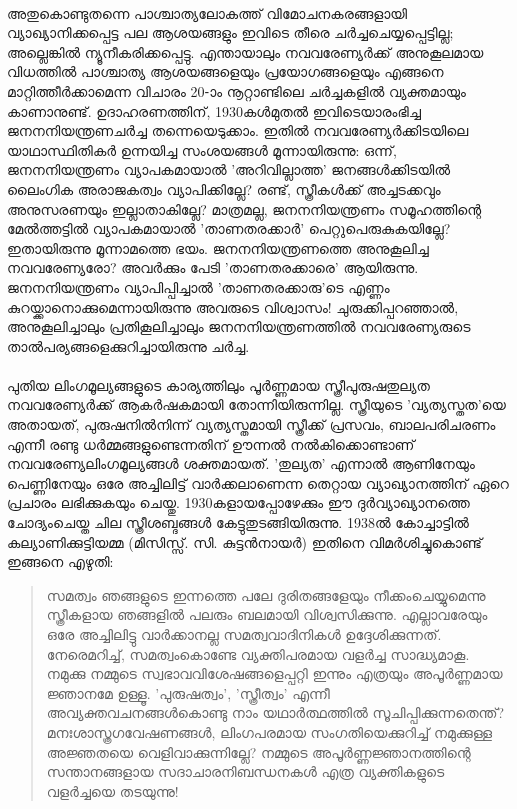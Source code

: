 \paragraph{}
അതുകൊണ്ടുതന്നെ പാശ്ചാത്യലോകത്ത് വിമോചനകരങ്ങളായി വ്യാഖ്യാനിക്കപ്പെട്ട പല ആശയങ്ങളും ഇവിടെ തീരെ ചർച്ചചെയ്യപ്പെട്ടില്ല; അല്ലെങ്കിൽ ന്യൂനീകരിക്കപ്പെട്ടു. എന്തായാലും നവവരേണ്യർക്ക് അനുകൂലമായ വിധത്തിൽ പാശ്ചാത്യ ആശയങ്ങളെയും പ്രയോഗങ്ങളെയും എങ്ങനെ മാറ്റിത്തീർക്കാമെന്ന വിചാരം 20-ാം നൂറ്റാണ്ടിലെ ചർച്ചകളിൽ വ്യക്തമായും കാണാനുണ്ട്. ഉദാഹരണത്തിന്, 1930കൾമുതൽ ഇവിടെയാരംഭിച്ച ജനനനിയന്ത്രണചർച്ച തന്നെയെടുക്കാം. ഇതിൽ നവവരേണ്യർക്കിടയിലെ യാഥാസ്ഥിതികർ ഉന്നയിച്ച സംശയങ്ങൾ മൂന്നായിരുന്നു: ഒന്ന്, ജനനനിയന്ത്രണം വ്യാപകമായാൽ 'അറിവില്ലാത്ത' ജനങ്ങൾക്കിടയിൽ ലൈംഗിക അരാജകത്വം വ്യാപിക്കില്ലേ? രണ്ട്, സ്ത്രീകൾക്ക് അച്ചടക്കവും അനുസരണയും ഇല്ലാതാകില്ലേ? മാത്രമല്ല, ജനനനിയന്ത്രണം സമൂഹത്തിന്റെ മേൽത്തട്ടിൽ വ്യാപകമായാൽ 'താണതരക്കാർ' പെറ്റുപെരുകുകയില്ലേ? ഇതായിരുന്നു മൂന്നാമത്തെ ഭയം. ജനനനിയന്ത്രണത്തെ അനുകൂലിച്ച നവവരേണ്യരോ? അവർക്കും പേടി 'താണതരക്കാരെ' ആയിരുന്നു. ജനനനിയന്ത്രണം വ്യാപിപ്പിച്ചാൽ 'താണതരക്കാരു'ടെ എണ്ണം കുറയ്ക്കാനൊക്കുമെന്നായിരുന്നു അവരുടെ വിശ്വാസം! ചുരുക്കിപ്പറഞ്ഞാൽ, അനുകൂലിച്ചാലും പ്രതികൂലിച്ചാലും ജനനനിയന്ത്രണത്തിൽ നവവരേണ്യരുടെ താൽപര്യങ്ങളെക്കുറിച്ചായിരുന്നു ചർച്ച.

\paragraph{}പുതിയ ലിംഗമൂല്യങ്ങളുടെ കാര്യത്തിലും പൂർണ്ണമായ സ്ത്രീപുരുഷതുല്യത നവവരേണ്യർക്ക് ആകർഷകമായി തോന്നിയിരുന്നില്ല. സ്ത്രീയുടെ 'വ്യത്യസ്തത'യെ അതായത്, പുരുഷനിൽനിന്ന് വ്യത്യസ്തമായി സ്ത്രീക്ക് പ്രസവം, ബാലപരിചരണം എന്നീ രണ്ടു ധർമ്മങ്ങളുണ്ടെന്നതിന് ഊന്നൽ നൽകിക്കൊണ്ടാണ് നവവരേണ്യലിംഗമൂല്യങ്ങൾ ശക്തമായത്. 'തുല്യത' എന്നാൽ ആണിനേയും പെണ്ണിനേയും ഒരേ അച്ചിലിട്ട് വാർക്കലാണെന്ന തെറ്റായ വ്യാഖ്യാനത്തിന് ഏറെ പ്രചാരം ലഭിക്കുകയും ചെയ്തു. 1930കളായപ്പോഴേക്കും ഈ ദുർവ്യാഖ്യാനത്തെ ചോദ്യംചെയ്ത ചില സ്ത്രീശബ്ദങ്ങൾ കേട്ടുതുടങ്ങിയിരുന്നു. 1938ൽ കോച്ചാട്ടിൽ കല്യാണിക്കുട്ടിയമ്മ (മിസിസ്സ്. സി. കുട്ടൻനായർ) ഇതിനെ വിമർശിച്ചുകൊണ്ട് ഇങ്ങനെ എഴുതി:

\begin{quotation}
\noindent സമത്വം ഞങ്ങളുടെ ഇന്നത്തെ പലേ ദുരിതങ്ങളേയും നീക്കംചെയ്യുമെന്നു സ്ത്രീകളായ ഞങ്ങളിൽ പലരും ബലമായി വിശ്വസിക്കുന്നു. എല്ലാവരേയും ഒരേ അച്ചിലിട്ടു വാർക്കാനല്ല സമത്വവാദിനികൾ ഉദ്ദേശിക്കുന്നത്. നേരെമറിച്ച്, സമത്വംകൊണ്ടേ വ്യക്തിപരമായ വളർച്ച സാദ്ധ്യമാകൂ. നമുക്കു നമ്മുടെ സ്വഭാവവിശേഷങ്ങളെപ്പറ്റി ഇന്നും എത്രയും അപൂർണ്ണമായ ജ്ഞാനമേ ഉള്ളൂ. 'പുരുഷത്വം', 'സ്ത്രീത്വം' എന്നീ അവ്യക്തവചനങ്ങൾകൊണ്ടു നാം യഥാർത്ഥത്തിൽ സൂചിപ്പിക്കുന്നതെന്ത്? മനഃശാസ്ത്രഗവേഷണങ്ങൾ, ലിംഗപരമായ സംഗതിയെക്കുറിച്ച് നമുക്കുള്ള അജ്ഞതയെ വെളിവാക്കുന്നില്ലേ? നമ്മുടെ അപൂർണ്ണജ്ഞാനത്തിന്റെ സന്താനങ്ങളായ സദാചാരനിബന്ധനകൾ എത്ര വ്യക്തികളുടെ വളർച്ചയെ തടയുന്നു!

\end{quotation}


